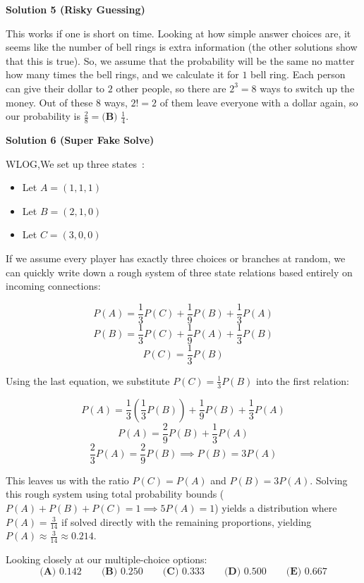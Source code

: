\begin{enumerate}
\textbf{Solution 5 (Risky Guessing)}

This works if one is short on time. Looking at how simple answer choices are, it seems like the number of bell rings is extra information (the other solutions show that this is true). So, we assume that the probability will be the same no matter how many times the bell rings, and we calculate it for $1$ bell ring. Each person can give their dollar to $2$ other people, so there are $2^3=8$ ways to switch up the money. Out of these $8$ ways, $2! = 2$ of them leave everyone with a dollar again, so our probability is $\frac{2}{8} = \boxed{\textbf{(B) } \frac{1}{4}}$.

 



\textbf{Solution 6 (Super Fake Solve)}

WLOG,We set up three states :

 
            \begin{itemize}
        \item Let $A = (1,1,1)$
        \item Let $B = (2,1,0)$
        \item Let $C = (3,0,0)$
            \end{itemize}
            If we assume every player has exactly three choices or branches at random, we can quickly write down a rough system of three state relations based entirely on incoming connections:

 
 \[P(A) = \frac{1}{3}P(C) + \frac{1}{9}P(B) + \frac{1}{3}P(A)\]
 \[P(B) = \frac{1}{3}P(C) + \frac{1}{9}P(A) + \frac{1}{3}P(B)\]
 \[P(C) = \frac{1}{3}P(B)\]

 Using the last equation, we substitute $P(C) = \frac{1}{3}P(B)$ into the first relation:

 
 \[P(A) = \frac{1}{3}\left(\frac{1}{3}P(B)\right) + \frac{1}{9}P(B) + \frac{1}{3}P(A)\]
 \[P(A) = \frac{2}{9}P(B) + \frac{1}{3}P(A)\]
 \[\frac{2}{3}P(A) = \frac{2}{9}P(B) \implies P(B) = 3P(A)\]

 This leaves us with the ratio $P(C) = P(A)$ and $P(B) = 3P(A)$. Solving this rough system using total probability bounds ($P(A) + P(B) + P(C) = 1 \implies 5P(A) = 1$) yields a distribution where $P(A) = \frac{3}{14}$ if solved directly with the remaining proportions, yielding $P(A) \approx \frac{3}{14} \approx 0.214$.

 Looking closely at our multiple-choice options:
 \[\textbf{(A) } 0.142 \qquad\textbf{(B) } 0.250 \qquad\textbf{(C) } 0.333 \qquad\textbf{(D) } 0.500 \qquad\textbf{(E) } 0.667\]


\end{enumerate}
